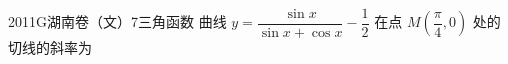 
\begin{problem}{2011}{G}{湖南卷（文）}{7}{三角函数}
曲线 $y=\dfrac{\sin x}{\sin x+\cos x}-\dfrac{1}{2}$ 在点 $M(\dfrac{\pi}{4},0)$ 处的切线的斜率为
\begin{choices}
\end{choices}
\end{problem}